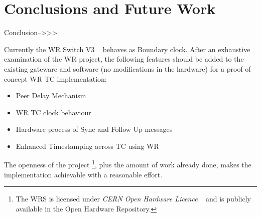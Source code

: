 \section{Conclusions and Future Work}


Conclusion-->>>






Currently the WR Switch V3 ~\cite{biblio:wrswitch} behaves as Boundary clock.
After an exhaustive examination of the WR project, the following features should be
added to the existing gateware and software (no modifications in the hardware)
for a proof of concept WR TC implementation:

\begin{itemize}
    \item Peer Delay Mechanism
    \item WR TC clock behaviour
    \item Hardware process of Sync and Follow Up messages
    \item Enhanced Timestamping across TC using WR
\end{itemize}

The openness of the project \footnote{The WRS is licensed under \textit{CERN Open Hardware Licence}
~\cite{biblio:lic}  and is publicly available in the Open Hardware Repository.},
plus the amount of work already done, makes the implementation achievable with a
reasonable effort.
